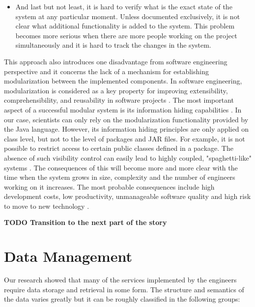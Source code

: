 \begin{itemize}
	\item And last but not least, it is hard to verify what is the exact state of the system at any particular moment. Unless documented exclusively, it is not clear what additional functionality is added to the system. This problem becomes more serious when there are more people working on the project simultaneously and it is hard to track the changes in the system.
		
\end{itemize}

This approach also introduces one disadvantage from software engineering perspective and it concerns the lack of a mechanism for establishing modularization between the implemented components. In software engineering, modularization is considered as a key property for improving extensibility, comprehensibility, and reusability in software projects \cite{parnas1972criteria}. The most important aspect of a successful modular system is its information hiding capabilities \cite{srivastava2008modular}. In our case, scientists can only rely on the modularization functionality provided by the Java language. However, its information hiding principles are only applied on class level, but not to the level of packages and JAR files. For example, it is not possible to restrict access to certain public classes defined in a package. The absence of such visibility control can easily lead to highly coupled, "spaghetti-like" systems \cite{eder1994coupling}. The consequences of this will become more and more clear with the time when the system grows in size, complexity and the number of engineers working on it increases. The most probable consequences include high development costs, low productivity, unmanageable software quality and high risk to move to new technology \cite{cai2000component}.

\textbf{TODO Transition to the next part of the story}

\section{Data Management}
\label{sec:problemDefStorage}

Our research showed that many of the services implemented by the engineers require data storage and retrieval in some form. The structure and semantics of the data varies greatly but it can be roughly classified in the following groups:

